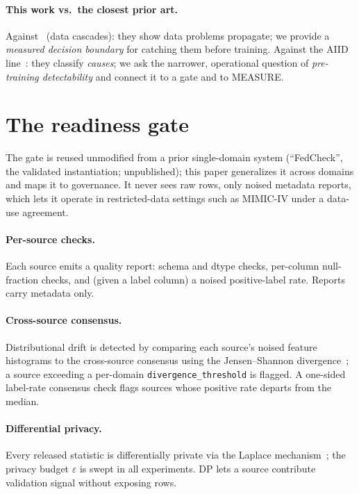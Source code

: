 \documentclass[11pt]{article}
\begin{document}
\paragraph{This work vs.\ the closest prior art.}
Against~\citet{sambasivan2021datacascades} (data cascades): they show data
problems propagate; we provide a \emph{measured decision boundary} for catching
them before training. Against the AIID line~\citep{mcgregor2021aiid,paeth2024aiid}:
they classify \emph{causes}; we ask the narrower, operational question of
\emph{pre-training detectability} and connect it to a gate and to MEASURE.

\section{The readiness gate}\label{sec:gate}

The gate is reused unmodified from a prior single-domain system (``FedCheck'',
the validated instantiation; unpublished); this paper generalizes it across
domains and maps it to governance. It never sees raw rows, only noised metadata
reports, which lets it operate in restricted-data settings such as MIMIC-IV under a
data-use agreement.

\paragraph{Per-source checks.} Each source emits a quality report: schema and
dtype checks, per-column null-fraction checks, and (given a label column) a noised
positive-label rate. Reports carry metadata only.

\paragraph{Cross-source consensus.} Distributional drift is detected by comparing
each source's noised feature histograms to the cross-source consensus using the
Jensen--Shannon divergence~\citep{jensenshannon}; a source exceeding a per-domain
\texttt{divergence\_threshold} is flagged. A one-sided label-rate consensus check
flags sources whose positive rate departs from the median.

\paragraph{Differential privacy.} Every released statistic is differentially
private via the Laplace mechanism~\citep{dwork2014}; the privacy budget
$\varepsilon$ is swept in all experiments. DP lets a source contribute validation
signal without exposing rows.
\end{document}
